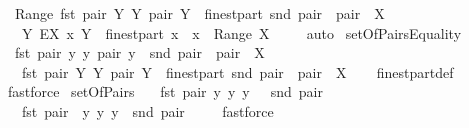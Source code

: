 \begin{isabellebody}
\ \ {\isachardoublequoteopen}Range\ {\isacharbraceleft}{\isacharparenleft}fst\ pair{\isacharcomma}\ Y{\isacharparenright}{\isacharbar}\ Y\ pair{\isachardot}\ Y\ {\isasymin}\ finestpart\ {\isacharparenleft}snd\ pair{\isacharparenright}\ {\isacharampersand}\ pair\ {\isasymin}\ X{\isacharbraceright}\ {\isacharequal}\ \isanewline
\ \ \ {\isacharbraceleft}Y{\isachardot}\ EX\ x{\isachardot}\ {\isacharparenleft}{\isacharparenleft}Y\ {\isasymin}\ finestpart\ x{\isacharparenright}\ {\isacharampersand}\ {\isacharparenleft}x\ {\isasymin}\ Range\ X{\isacharparenright}{\isacharparenright}{\isacharbraceright}{\isachardoublequoteclose}\ \isanewline
%
\isadelimproof
\ \ %
\endisadelimproof
%
\isatagproof
{}\isamarkupfalse%
\ auto%
\endisatagproof
{\isafoldproof}%
%
\isadelimproof
\isanewline
%
\endisadelimproof
\isanewline
\isanewline
{}\isamarkupfalse%
\ setOfPairsEquality{\isacharcolon}\ \isanewline
\ \ {\isachardoublequoteopen}{\isacharbraceleft}{\isacharparenleft}fst\ pair{\isacharcomma}\ {\isacharbraceleft}y{\isacharbraceright}{\isacharparenright}{\isacharbar}\ y\ pair{\isachardot}\ y\ {\isasymin}\ snd\ pair\ {\isacharampersand}\ pair\ {\isasymin}\ X{\isacharbraceright}\ {\isacharequal}\ \isanewline
\ \ \ {\isacharbraceleft}{\isacharparenleft}fst\ pair{\isacharcomma}\ Y{\isacharparenright}{\isacharbar}\ Y\ pair{\isachardot}\ Y\ {\isasymin}\ finestpart\ {\isacharparenleft}snd\ pair{\isacharparenright}\ {\isacharampersand}\ pair\ {\isasymin}\ X{\isacharbraceright}{\isachardoublequoteclose}\isanewline
%
\isadelimproof
\ \ %
\endisadelimproof
%
\isatagproof
{}\isamarkupfalse%
\ finestpart{\isacharunderscore}def\ \isamarkupfalse%
\ fastforce%
\endisatagproof
{\isafoldproof}%
%
\isadelimproof
\isanewline
%
\endisadelimproof
\isanewline
{}\isamarkupfalse%
\ setOfPairs{\isacharcolon}\ \isanewline
\ \ {\isachardoublequoteopen}{\isacharbraceleft}{\isacharparenleft}fst\ pair{\isacharcomma}\ {\isacharbraceleft}y{\isacharbraceright}{\isacharparenright}{\isacharbar}\ y{\isachardot}\ y\ {\isasymin}\ \ snd\ pair{\isacharbraceright}\ {\isacharequal}\ \isanewline
\ \ \ {\isacharbraceleft}fst\ pair{\isacharbraceright}\ {\isasymtimes}\ {\isacharbraceleft}{\isacharbraceleft}y{\isacharbraceright}{\isacharbar}\ y{\isachardot}\ y\ {\isasymin}\ snd\ pair{\isacharbraceright}{\isachardoublequoteclose}\ \isanewline
%
\isadelimproof
\ \ %
\endisadelimproof
%
\isatagproof
{}\isamarkupfalse%
\ fastforce%
\endisatagproof
{\isafoldproof}%
%
\isadelimproof
\isanewline
%
\endisadelimproof
\isanewline
{}\isamarkupfalse%

\end{isabellebody}
